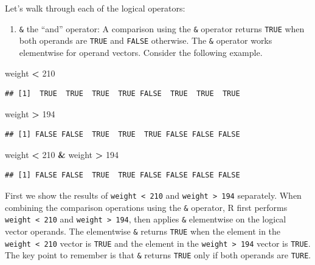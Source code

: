 \documentclass[
]{krantz}
\newenvironment{Shaded}{\begin{snugshade}}{\end{snugshade}}
\newcommand{\DecValTok}[1]{\textcolor[rgb]{0.00,0.00,0.81}{#1}}
\newcommand{\NormalTok}[1]{#1}
\newcommand{\OperatorTok}[1]{\textcolor[rgb]{0.81,0.36,0.00}{\textbf{#1}}}
\newcommand{\StringTok}[1]{\textcolor[rgb]{0.31,0.60,0.02}{#1}}
\providecommand{\tightlist}{%
  \setlength{\itemsep}{0pt}\setlength{\parskip}{0pt}}
\begin{document}
Let's walk through each of the logical operators:

\begin{enumerate}
\def\labelenumi{\arabic{enumi}.}
\tightlist
\item
  \texttt{\&} the ``and'' operator: A comparison using the \texttt{\&} operator returns \texttt{TRUE} when both operands are \texttt{TRUE} and \texttt{FALSE} otherwise. The \texttt{\&} operator works elementwise for operand vectors. Consider the following example.
\end{enumerate}

\begin{Shaded}
\begin{Highlighting}[]
\NormalTok{weight }\OperatorTok{\textless{}}\StringTok{ }\DecValTok{210}
\end{Highlighting}
\end{Shaded}

\begin{verbatim}
## [1]  TRUE  TRUE  TRUE  TRUE FALSE  TRUE  TRUE  TRUE
\end{verbatim}

\begin{Shaded}
\begin{Highlighting}[]
\NormalTok{weight }\OperatorTok{\textgreater{}}\StringTok{ }\DecValTok{194}
\end{Highlighting}
\end{Shaded}

\begin{verbatim}
## [1] FALSE FALSE  TRUE  TRUE  TRUE FALSE FALSE FALSE
\end{verbatim}

\begin{Shaded}
\begin{Highlighting}[]
\NormalTok{weight }\OperatorTok{\textless{}}\StringTok{ }\DecValTok{210} \OperatorTok{\&}\StringTok{ }\NormalTok{weight }\OperatorTok{\textgreater{}}\StringTok{ }\DecValTok{194}
\end{Highlighting}
\end{Shaded}

\begin{verbatim}
## [1] FALSE FALSE  TRUE  TRUE FALSE FALSE FALSE FALSE
\end{verbatim}

First we show the results of \texttt{weight\ \textless{}\ 210} and \texttt{weight\ \textgreater{}\ 194} separately. When combining the comparison operations using the \texttt{\&} operator, R first performs \texttt{weight\ \textless{}\ 210} and \texttt{weight\ \textgreater{}\ 194}, then applies \texttt{\&} elementwise on the logical vector operands. The elementwise \texttt{\&} returns \texttt{TRUE} when the element in the \texttt{weight\ \textless{}\ 210} vector is \texttt{TRUE} and the element in the \texttt{weight\ \textgreater{}\ 194} vector is \texttt{TRUE}. The key point to remember is that \texttt{\&} returns \texttt{TRUE} only if both operands are \texttt{TURE}.
\end{document}
